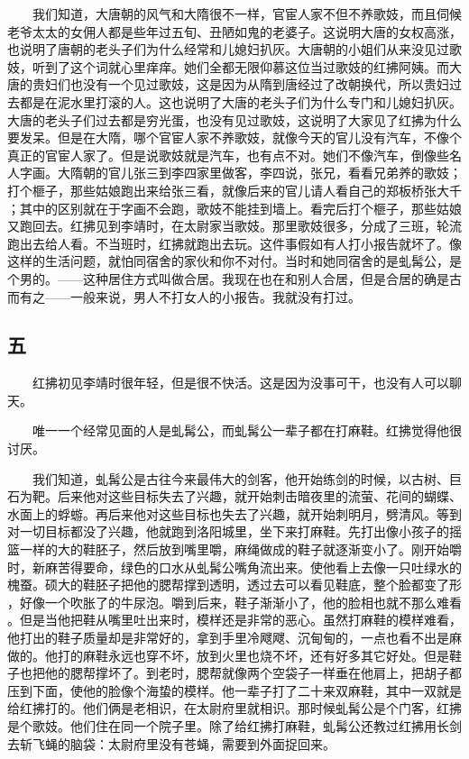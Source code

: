  　　我们知道，大唐朝的风气和大隋很不一样，官宦人家不但不养歌妓，而且伺候 老爷太太的女佣人都是些年过五旬、丑陋如鬼的老婆子。这说明大唐的女权高涨， 也说明了唐朝的老头子们为什么经常和儿媳妇扒灰。大唐朝的小姐们从来没见过歌 妓，听到了这个词就心里痒痒。她们全都无限仰慕这位当过歌妓的红拂阿姨。而大 唐的贵妇们也没有一个见过歌妓，这是因为从隋到唐经过了改朝换代，所以贵妇过 去都是在泥水里打滚的人。这也说明了大唐的老头子们为什么专门和儿媳妇扒灰。 大唐的老头子们过去都是穷光蛋，也没有见过歌妓，这说明了大家见了红拂为什么 要发呆。但是在大隋，哪个官宦人家不养歌妓，就像今天的官儿没有汽车，不像个 真正的官宦人家了。但是说歌妓就是汽车，也有点不对。她们不像汽车，倒像些名 人字画。大隋朝的官儿张三到李四家里做客，李四说，张兄，看看兄弟养的歌妓； 打个榧子，那些姑娘跑出来给张三看，就像后来的官儿请人看自己的郑板桥张大千 ；其中的区别就在于字画不会跑，歌妓不能挂到墙上。看完后打个榧子，那些姑娘 又跑回去。红拂见到李靖时，在太尉家当歌妓。那里歌妓很多，分成了三班，轮流 跑出去给人看。不当班时，红拂就跑出去玩。这件事假如有人打小报告就坏了。像 这样的生活问题，就怕同宿舍的家伙和你不对付。当时和她同宿舍的是虬髯公，是 个男的。——这种居住方式叫做合居。我现在也在和别人合居，但是合居的确是古 而有之——一般来说，男人不打女人的小报告。我就没有打过。 
 
 
\subsection{五} 
 
 　　红拂初见李靖时很年轻，但是很不快活。这是因为没事可干，也没有人可以聊 天。 

　　唯一一个经常见面的人是虬髯公，而虬髯公一辈子都在打麻鞋。红拂觉得他很 讨厌。 

　　我们知道，虬髯公是古往今来最伟大的剑客，他开始练剑的时候，以古树、巨 石为靶。后来他对这些目标失去了兴趣，就开始刺击暗夜里的流萤、花间的蝴蝶、 水面上的蜉蝣。再后来他对这些目标也失去了兴趣，就开始刺明月，劈清风。等到 对一切目标都没了兴趣，他就跑到洛阳城里，坐下来打麻鞋。先打出像小孩子的摇 篮一样的大的鞋胚子，然后放到嘴里嚼，麻绳做成的鞋子就逐渐变小了。刚开始嚼 时，新麻苦得要命，绿色的口水从虬髯公嘴角流出来。使他看上去像一只吐绿水的 槐蚕。硕大的鞋胚子把他的腮帮撑到透明，透过去可以看见鞋底，整个脸都变了形 ，好像一个吹胀了的牛尿泡。嚼到后来，鞋子渐渐小了，他的脸相也就不那么难看 。但是当他把鞋从嘴里吐出来时，模样还是非常的恶心。虽然打麻鞋的模样难看， 他打出的鞋子质量却是非常好的，拿到手里冷飕飕、沉甸甸的，一点也看不出是麻 做的。他打的麻鞋永远也穿不坏，放到火里也烧不坏，还有好多其它好处。但是鞋 子也把他的腮帮撑坏了。到老时，腮帮就像两个空袋子一样垂在他肩上，把胡子都 压到下面，使他的脸像个海蛰的模样。他一辈子打了二十来双麻鞋，其中一双就是 给红拂打的。他们俩是老相识，在太尉府里就相识。那时候虬髯公是个门客，红拂 是个歌妓。他们住在同一个院子里。除了给红拂打麻鞋，虬髯公还教过红拂用长剑 去斩飞蝇的脑袋：太尉府里没有苍蝇，需要到外面捉回来。 

